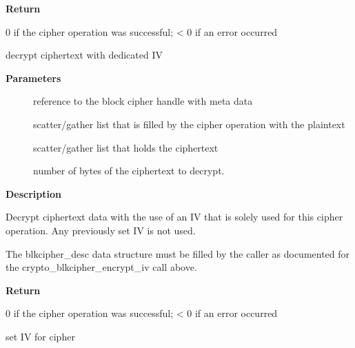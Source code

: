 \documentclass[a4paper,8pt,english]{sphinxmanual}
\begin{document}
\textbf{Return}

0 if the cipher operation was successful; \textless{} 0 if an error occurred

\begin{fulllineitems}
\label{crypto/api-skcipher:c.crypto_blkcipher_decrypt_iv}
decrypt ciphertext with dedicated IV

\end{fulllineitems}


\textbf{Parameters}
\begin{description}
\item[{}] \leavevmode
reference to the block cipher handle with meta data

\item[{}] \leavevmode
scatter/gather list that is filled by the cipher operation with the
plaintext

\item[{}] \leavevmode
scatter/gather list that holds the ciphertext

\item[{}] \leavevmode
number of bytes of the ciphertext to decrypt.

\end{description}

\textbf{Description}

Decrypt ciphertext data with the use of an IV that is solely used for this
cipher operation. Any previously set IV is not used.

The blkcipher\_desc data structure must be filled by the caller as documented
for the crypto\_blkcipher\_encrypt\_iv call above.

\textbf{Return}

0 if the cipher operation was successful; \textless{} 0 if an error occurred

\begin{fulllineitems}
\label{crypto/api-skcipher:c.crypto_blkcipher_set_iv}
set IV for cipher

\end{fulllineitems}
\end{document}
